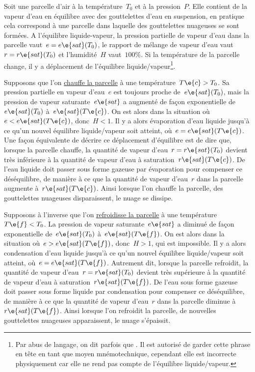 \sk
Soit une parcelle d'air à la température~$T_0$ et à la pression~$P$. Elle contient de la vapeur d'eau en équilibre avec des gouttelettes d'eau en suspension, en pratique cela correspond à une parcelle dans laquelle des gouttelettes nuageuses se sont formées. A l'équilibre liquide-vapeur, la pression partielle de vapeur d'eau dans la parcelle vaut~$e=e\e{sat}(T_0)$, le rapport de mélange de vapeur d'eau vaut~$r=r\e{sat}(T_0)$ et l'humidité~$H$ vaut~$100\%$. Si la température de la parcelle change, il y a déplacement de l'équilibre liquide/vapeur\footnote{Par abus de langage, on dit parfois que . Il est autorisé de garder cette phrase en tête en tant que moyen mnémotechnique, cependant elle est incorrecte physiquement car elle ne rend pas compte de l'équilibre liquide/vapeur.}.
\begin{finger}
\item
Supposons que l'on \underline{chauffe la parcelle} à une température~$T\e{c}>T_0$. Sa pression partielle en vapeur d'eau~$e$ est toujours proche de~$e\e{sat}(T_0)$, mais la pression de vapeur saturante~$e\e{sat}$ a augmenté de façon exponentielle de~$e\e{sat}(T_0)$ à~$e\e{sat}(T\e{c})$. On est alors dans la situation où~$e < e\e{sat}(T\e{c})$, donc~$H < 1$. Il y a alors évaporation d'eau liquide jusqu'à ce qu'un nouvel équilibre liquide/vapeur soit atteint, où~$e = e\e{sat}(T\e{c})$. Une façon équivalente de décrire ce déplacement d'équilibre est de dire que, lorsque la parcelle chauffe, la quantité de vapeur d'eau~$r=r\e{sat}(T_0)$ devient très inférieure à la quantité de vapeur d'eau à saturation~$r\e{sat}(T\e{c})$. De l'eau liquide doit passer sous forme gazeuse par évaporation pour compenser ce déséquilibre, de manière à ce que la quantité de vapeur d'eau~$r$ dans la parcelle augmente à~$r\e{sat}(T\e{c})$. Ainsi lorsque l'on chauffe la parcelle, des gouttelettes nuageuses disparaissent, le nuage se dissipe.
\item
Supposons à l'inverse que l'on \underline{refroidisse la parcelle} à une température~$T\e{f}<T_0$. La pression de vapeur saturante~$e\e{sat}$ a diminué de façon exponentielle de~$e\e{sat}(T_0)$ à~$e\e{sat}(T\e{f})$. On est alors dans la situation où~$e > e\e{sat}(T\e{f})$, donc~$H > 1$, qui est impossible. Il y a alors condensation d'eau liquide jusqu'à ce qu'un nouvel équilibre liquide/vapeur soit atteint, où~$e = e\e{sat}(T\e{f})$. Autrement dit, lorsque la parcelle refroidit, la quantité de vapeur d'eau~$r=r\e{sat}(T_0)$ devient très supérieure à la quantité de vapeur d'eau à saturation~$r\e{sat}(T\e{f})$. De l'eau sous forme gazeuse doit passer sous forme liquide par condensation pour compenser ce déséquilibre, de manière à ce que la quantité de vapeur d'eau~$r$ dans la parcelle diminue à~$r\e{sat}(T\e{f})$. Ainsi lorsque l'on refroidit la parcelle, de nouvelles gouttelettes nuageuses apparaissent, le nuage s'épaissit.
\end{finger}

